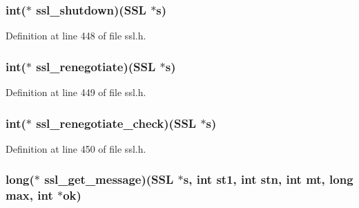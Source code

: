 \subsubsection[{\texorpdfstring{ssl\+\_\+shutdown}{ssl_shutdown}}]{\setlength{\rightskip}{0pt plus 5cm}int($\ast$ ssl\+\_\+shutdown)({\bf S\+SL} $\ast$s)}\hypertarget{structssl__method__st_ae7da0e04c68fbcc5077e749456b796b2}{}\label{structssl__method__st_ae7da0e04c68fbcc5077e749456b796b2}


Definition at line 448 of file ssl.\+h.

\subsubsection[{\texorpdfstring{ssl\+\_\+renegotiate}{ssl_renegotiate}}]{\setlength{\rightskip}{0pt plus 5cm}int($\ast$ ssl\+\_\+renegotiate)({\bf S\+SL} $\ast$s)}\hypertarget{structssl__method__st_ab9b41c9a1970365d6071c2e32715a38d}{}\label{structssl__method__st_ab9b41c9a1970365d6071c2e32715a38d}


Definition at line 449 of file ssl.\+h.

\subsubsection[{\texorpdfstring{ssl\+\_\+renegotiate\+\_\+check}{ssl_renegotiate_check}}]{\setlength{\rightskip}{0pt plus 5cm}int($\ast$ ssl\+\_\+renegotiate\+\_\+check)({\bf S\+SL} $\ast$s)}\hypertarget{structssl__method__st_a0e0d93a372aef1cdb72ec025a2a9ec6b}{}\label{structssl__method__st_a0e0d93a372aef1cdb72ec025a2a9ec6b}


Definition at line 450 of file ssl.\+h.

\subsubsection[{\texorpdfstring{ssl\+\_\+get\+\_\+message}{ssl_get_message}}]{\setlength{\rightskip}{0pt plus 5cm}long($\ast$ ssl\+\_\+get\+\_\+message)({\bf S\+SL} $\ast$s, int st1, int stn, int mt, long max, int $\ast$ok)}\hypertarget{structssl__method__st_a05dd06794630d13d8728503772dfa9b4}{}\label{structssl__method__st_a05dd06794630d13d8728503772dfa9b4}


